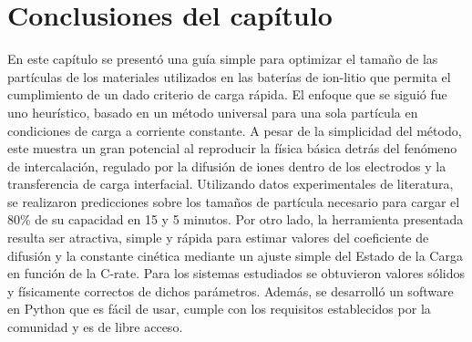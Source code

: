 \section{Conclusiones del capítulo}

En este capítulo se presentó una guía simple para optimizar el tamaño de las 
partículas de los materiales utilizados en las baterías de ion-litio que permita
el cumplimiento de un dado criterio de carga rápida. El enfoque que se siguió
fue uno heurístico, basado en un método universal para una sola partícula en
condiciones de carga a corriente constante. A pesar de la simplicidad del método, 
este muestra un gran potencial al reproducir la física básica detrás del 
fenómeno de intercalación, regulado por la difusión de iones dentro de los 
electrodos y la transferencia de carga interfacial. Utilizando datos 
experimentales de literatura, se realizaron predicciones sobre los tamaños de
partícula necesario para cargar el 80\% de su capacidad en 15 y 5 minutos. 
Por otro lado, la herramienta presentada resulta ser atractiva, simple y rápida 
para estimar valores del coeficiente de difusión y la constante cinética mediante
un ajuste simple del Estado de la Carga en función de la C-rate. Para los 
sistemas estudiados se obtuvieron valores sólidos y físicamente correctos de
dichos parámetros. Además, se desarrolló un software en Python que es fácil 
de usar, cumple con los requisitos establecidos por la comunidad y es de libre
acceso.
